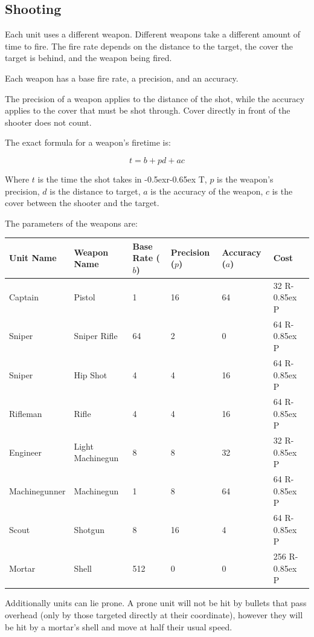 \documentclass{article}
\newcommand{\RT}{\lower-0.5ex\hbox{r}\kern-0.65ex T}
\newcommand{\RP}{R\kern-0.85ex P}
\begin{document}
\subsection{Shooting}

Each unit uses a different weapon. Different weapons take a different amount of
time to fire. The fire rate depends on the distance to the target, the cover the
target is behind, and the weapon being fired.

Each weapon has a base fire rate, a precision, and an accuracy.

The precision of a weapon applies to the distance of the shot, while the
accuracy applies to the cover that must be shot through. Cover directly in front
of the shooter does not count.

The exact formula for a weapon's firetime is:

$$t=b+pd+ac$$

Where $t$ is the time the shot takes in \RT, $p$ is the weapon's precision, $d$
is the distance to target, $a$ is the accuracy of the weapon, $c$ is the cover
between the shooter and the target.

The parameters of the weapons are:

\begin{minipage}{\textwidth}
\centering
\begin{tabular}{llllll}
    \hline
        Unit Name &
        Weapon Name &
        Base Rate ($b$) &
        Precision ($p$) &
        Accuracy ($a$) &
        Cost \\ \hline
    Captain & Pistol & 1 & 16 & 64 & 32 \RP \\
    Sniper & Sniper Rifle & 64 & 2 & 0 & 64 \RP \\
    Sniper & Hip Shot & 4 & 4 & 16 & 64 \RP \\
    Rifleman & Rifle & 4 & 4 & 16 & 64 \RP \\
    Engineer & Light Machinegun & 8 & 8 & 32 & 32 \RP \\
    Machinegunner & Machinegun & 1 & 8 & 64 & 64 \RP \\
    Scout & Shotgun & 8 & 16 & 4 & 64 \RP \\
    Mortar & Shell & 512 & 0 & 0 & 256 \RP \\
\end{tabular}
\end{minipage}

Additionally units can lie prone. A prone unit will not be hit by bullets that
pass overhead (only by those targeted directly at their coordinate), however
they will be hit by a mortar's shell and move at half their usual speed.
\end{document}
